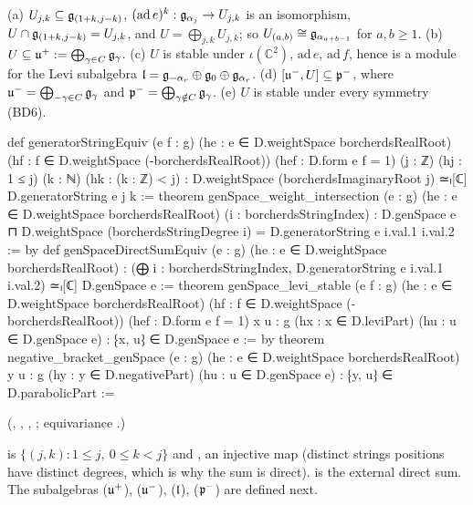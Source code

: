 \begin{theorem}[Structure of $U$]\label{ch18:thm:Ustructure}
(a) $U_{j,k}\subseteq\mathfrak{g}_{(1+k,j-k)}$, $(\mathrm{ad}\,e)^k:\mathfrak{g}_{\alpha_j}\to U_{j,k}$ is an isomorphism, $U\cap\mathfrak{g}_{(1+k,j-k)}=U_{j,k}$, and
$U=\bigoplus_{j,k}U_{j,k}$; so $U_{(a,b)}\cong\mathfrak{g}_{\alpha_{a+b-1}}$ for $a,b\ge1$.  (b) $U\subseteq\mathfrak{u}^+:=\bigoplus_{\gamma\in C}\mathfrak{g}_\gamma$.  (c) $U$
is stable under $\iota(\mathbb C^2)$, $\mathrm{ad}\,e$, $\mathrm{ad}\,f$, hence is a module for the Levi subalgebra
$\mathfrak{l}=\mathfrak{g}_{-\alpha_r}\oplus\mathfrak{g}_0\oplus\mathfrak{g}_{\alpha_r}$.  (d) $[\mathfrak{u}^-,U]\subseteq\mathfrak{p}^-$, where $\mathfrak{u}^-=\bigoplus_{-\gamma\in C}\mathfrak{g}_\gamma$ and
$\mathfrak{p}^-=\bigoplus_{\gamma\notin C}\mathfrak{g}_\gamma$.  (e) $U$ is stable under every symmetry (BD6).
\end{theorem}
\begin{leancode}
def generatorStringEquiv (e f : g)
    (he : e ∈ D.weightSpace borcherdsRealRoot)
    (hf : f ∈ D.weightSpace (-borcherdsRealRoot)) (hef : D.form e f = 1)
    (j : ℤ) (hj : 1 ≤ j) (k : ℕ) (hk : (k : ℤ) < j) :
    D.weightSpace (borcherdsImaginaryRoot j) ≃ₗ[ℂ] D.generatorString e j k :=
theorem genSpace_weight_intersection (e : g) (he : e ∈ D.weightSpace borcherdsRealRoot)
    (i : borcherdsStringIndex) :
    D.genSpace e ⊓ D.weightSpace (borcherdsStringDegree i) =
      D.generatorString e i.val.1 i.val.2 := by
def genSpaceDirectSumEquiv (e : g) (he : e ∈ D.weightSpace borcherdsRealRoot) :
    (⨁ i : borcherdsStringIndex, D.generatorString e i.val.1 i.val.2) ≃ₗ[ℂ] D.genSpace e :=
theorem genSpace_levi_stable (e f : g)
    (he : e ∈ D.weightSpace borcherdsRealRoot)
    (hf : f ∈ D.weightSpace (-borcherdsRealRoot)) (hef : D.form e f = 1)
    {x u : g} (hx : x ∈ D.leviPart) (hu : u ∈ D.genSpace e) :
    ⁅x, u⁆ ∈ D.genSpace e := by
theorem negative_bracket_genSpace (e : g) (he : e ∈ D.weightSpace borcherdsRealRoot)
    {y u : g} (hy : y ∈ D.negativePart) (hu : u ∈ D.genSpace e) :
    ⁅y, u⁆ ∈ D.parabolicPart :=
\end{leancode}
(, ,
, ;
equivariance .)
\begin{dictionary}
 is $\{(j,k):1\le j,\ 0\le k<j\}$ and , an
injective map (distinct strings positions have distinct degrees, which is why the sum is direct).
 is the external direct sum.  The subalgebras  ($\mathfrak{u}^+$),  ($\mathfrak{u}^-$),
 ($\mathfrak{l}$),  ($\mathfrak{p}^-$) are defined next.
\end{dictionary}

